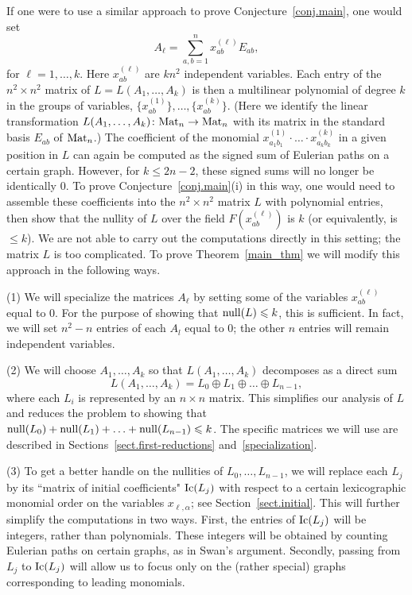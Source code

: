 \documentclass{amsproc}
\theoremstyle{definition}
\theoremstyle{remark}
\numberwithin{equation}{section}
\newcommand{\M}{{\rm Mat}}
\newcommand{\Ic}{{\rm Ic}}
\newcommand{\nullity}{{\rm null}}
\begin{document}
\smallskip
If one were to use a similar approach to prove Conjecture~\ref{conj.main}, one would set
\begin{equation} \label{e.general-matrix} A_{\ell} = \sum_{a, b = 1}^n  x_{ab}^{(\ell)} E_{a b} , \end{equation}
for $\ell = 1, \ldots, k$. Here $x_{ab}^{(\ell)}$ are $k n^2$
independent variables. Each entry of the $n^2 \times n^2$ matrix of $L = L(A_1, \ldots, A_k)$ 
is then a multilinear polynomial of degree $k$ in the groups of variables, $\{x_{ab}^{(1)} \}, \ldots, \{ x_{ab}^{(k)} \}$.
(Here we identify the linear transformation $L(A_1, \ldots, A_k) \colon \M_n \to \M_n$
with its matrix in the standard basis $E_{ab}$ of $\M_n$.)
The coefficient of the monomial $x_{a_1 b_1}^{(1)} \cdot \ldots \cdot x_{a_k b_k}^{(k)}$ in a given position 
in $L$ can again be computed as 
the signed sum of Eulerian paths on a certain graph. However, for $k \leqslant 2n-2$, these signed sums will no longer 
be identically $0$. To prove Conjecture~\ref{conj.main}(i) in this way, one would need to assemble these coefficients into 
the $n^2 \times n^2$ matrix $L$ with polynomial entries, then show that the nullity of $L$ over the field $F(x_{ab}^{(\ell)})$ 
is $k$ (or equivalently, is $\leqslant k$). We are not able to carry out the computations directly in this setting; 
the matrix $L$ is too complicated.  To prove Theorem~\ref{main_thm} we will modify this approach in the following ways.

\smallskip
(1) We will specialize the matrices $A_{\ell}$ by setting some of the variables $x_{ab}^{(\ell)}$ equal to $0$. 
For the purpose of showing that $\nullity(L) \leqslant k$, this is sufficient. 
In fact, we will set $n^2-n$ entries of each $A_l$ equal to $0$; the other $n$ entries will remain independent variables.

\smallskip
(2) We will choose $A_1, \ldots, A_k$ so that  $L(A_1, \dots, A_k)$ decomposes as a direct sum 
\[ L(A_1, \dots, A_k) = L_0 \oplus L_1 \oplus \ldots \oplus L_{n-1}, \]
where each $L_i$ is represented by an $n \times n$ matrix. This simplifies our analysis of $L$ and 
reduces the problem to showing that $\nullity(L_0) + \nullity(L_1) + \ldots + \nullity(L_{n-1}) \leqslant k$.
The specific matrices we will use are described in Sections~\ref{sect.first-reductions} and~\ref{specialization}.

\smallskip
(3) To get a better handle on the nullities of $L_0, \ldots, L_{n-1}$, we will replace each $L_j$ by its
``matrix of initial coefficients" $\Ic(L_j)$ with respect to a certain lexicographic monomial order on 
the variables $x_{\ell,\alpha}$; see Section~\ref{sect.initial}. This will further simplify the computations in two ways.
First, the entries of $\Ic(L_j)$ will be integers, rather than polynomials. These integers will be obtained by
counting Eulerian paths on certain graphs, as in Swan's argument. Secondly, 
passing from $L_j$ to $\Ic(L_j)$ will allow us to focus only on the (rather special) 
graphs corresponding to leading monomials. 
\end{document}
